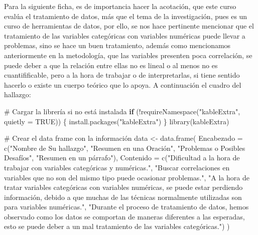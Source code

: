 \documentclass[
  letterpaper,
  DIV=11,
  numbers=noendperiod]{scrreprt}
\newenvironment{Shaded}{\begin{snugshade}}{\end{snugshade}}
\newcommand{\AttributeTok}[1]{\textcolor[rgb]{0.40,0.45,0.13}{#1}}
\newcommand{\CommentTok}[1]{\textcolor[rgb]{0.37,0.37,0.37}{#1}}
\newcommand{\ConstantTok}[1]{\textcolor[rgb]{0.56,0.35,0.01}{#1}}
\newcommand{\ControlFlowTok}[1]{\textcolor[rgb]{0.00,0.23,0.31}{\textbf{#1}}}
\newcommand{\FunctionTok}[1]{\textcolor[rgb]{0.28,0.35,0.67}{#1}}
\newcommand{\NormalTok}[1]{\textcolor[rgb]{0.00,0.23,0.31}{#1}}
\newcommand{\OtherTok}[1]{\textcolor[rgb]{0.00,0.23,0.31}{#1}}
\newcommand{\SpecialCharTok}[1]{\textcolor[rgb]{0.37,0.37,0.37}{#1}}
\newcommand{\StringTok}[1]{\textcolor[rgb]{0.13,0.47,0.30}{#1}}
\begin{document}
Para la siguiente ficha, es de importancia hacer la acotación, que este
curso evalúa el tratamiento de datos, más que el tema de la
investigación, pues es un curso de herramientas de datos, por ello, se
nos hace pertinente mencionar que el tratamiento de las variables
categóricas con variables numéricas puede llevar a problemas, sino se
hace un buen tratamiento, además como mencionamos anteriormente en la
metodología, que las variables presenten poca correlación, se puede
deber a que la relación entre ellas no es lineal o al menos no es
cuantifificable, pero a la hora de trabajar o de interpretarlas, si
tiene sentido hacerlo o existe un cuerpo teórico que lo apoya. A
continuación el cuadro del hallazgo:

\begin{Shaded}
\begin{Highlighting}[]
\CommentTok{\# Cargar la librería si no está instalada}
\ControlFlowTok{if}\NormalTok{ (}\SpecialCharTok{!}\FunctionTok{requireNamespace}\NormalTok{(}\StringTok{"kableExtra"}\NormalTok{, }\AttributeTok{quietly =} \ConstantTok{TRUE}\NormalTok{)) \{}
  \FunctionTok{install.packages}\NormalTok{(}\StringTok{"kableExtra"}\NormalTok{)}
\NormalTok{\}}
\FunctionTok{library}\NormalTok{(kableExtra)}

\CommentTok{\# Crear el data frame con la información}
\NormalTok{data }\OtherTok{\textless{}{-}} \FunctionTok{data.frame}\NormalTok{(}
  \AttributeTok{Encabezado =} \FunctionTok{c}\NormalTok{(}\StringTok{"Nombre de Su hallazgo"}\NormalTok{, }
                 \StringTok{"Resumen en una Oración"}\NormalTok{, }
                 \StringTok{"Problemas o Posibles Desafíos"}\NormalTok{, }
                 \StringTok{"Resumen en un párrafo"}\NormalTok{),}
  \AttributeTok{Contenido =} \FunctionTok{c}\NormalTok{(}\StringTok{"Dificultad a la hora de trabajar con variables categóricas y numéricas."}\NormalTok{, }
                \StringTok{"Buscar correlaciones en variables que no son del mismo tipo puede ocasionar problemas."}\NormalTok{, }
                \StringTok{"A la hora de tratar variables categóricas con variables numéricas, se puede estar perdiendo información, debido a que muchas de las técnicas normalmente utilizadas son para variables numéricas."}\NormalTok{, }
                \StringTok{"Durante el proceso de tratamiento de datos, hemos observado como los datos se comportan de maneras diferentes a las esperadas, esto se puede deber a un mal tratamiento de las variables categóricas."}\NormalTok{)}
\NormalTok{)}


\end{Highlighting}
\end{Shaded}
\end{document}
